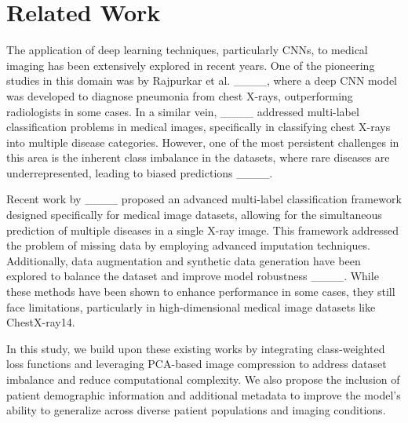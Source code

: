 \section{Related Work}
The application of deep learning techniques, particularly CNNs, to medical imaging has been extensively explored in recent years. One of the pioneering studies in this domain was by Rajpurkar et al. ____, where a deep CNN model was developed to diagnose pneumonia from chest X-rays, outperforming radiologists in some cases. In a similar vein, ____ addressed multi-label classification problems in medical images, specifically in classifying chest X-rays into multiple disease categories. However, one of the most persistent challenges in this area is the inherent class imbalance in the datasets, where rare diseases are underrepresented, leading to biased predictions ____.

Recent work by ____ proposed an advanced multi-label classification framework designed specifically for medical image datasets, allowing for the simultaneous prediction of multiple diseases in a single X-ray image. This framework addressed the problem of missing data by employing advanced imputation techniques. Additionally, data augmentation and synthetic data generation have been explored to balance the dataset and improve model robustness ____. While these methods have been shown to enhance performance in some cases, they still face limitations, particularly in high-dimensional medical image datasets like ChestX-ray14.

In this study, we build upon these existing works by integrating class-weighted loss functions and leveraging PCA-based image compression to address dataset imbalance and reduce computational complexity. We also propose the inclusion of patient demographic information and additional metadata to improve the model's ability to generalize across diverse patient populations and imaging conditions.